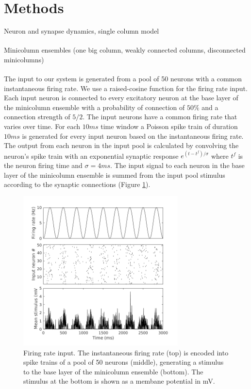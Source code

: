 \documentclass[a4paper,11pt]{article}
\begin{document}
\section{Methods}
Neuron and synapse dynamics, single column model
\\ \\
Minicolumn ensembles (one big column, weakly connected columns, disconnected minicolumns)
\\ \\
The input to our system is generated from a pool of 50 neurons with a common instantaneous firing rate.
We use a raised-cosine function for the firing rate input.
Each input neuron is connected to every excitatory neuron at the base layer of the minicolumn ensemble with a probability of connection of $50\%$ and a connection strength of $5/2$. 
The input neurons have a common firing rate that varies over time.
For each $10 ms$ time window a Poisson spike train of duration $10 ms$ is generated for every input neuron based on the instantaneous firing rate.
The output from each neuron in the input pool is calculated by convolving the neuron's spike train with an exponential synaptic response $e^{(t-t^f)/\sigma}$ where $t^f$ is the neuron firing time and $\sigma = 4ms$.
The input signal to each neuron in the base layer of the minicolumn ensemble is summed from the input pool stimulus according to the synaptic connections (Figure \ref{fig:firingrate_input}).

\begin{figure}[!ht]
 \caption{Firing rate input. The instantaneous firing rate (top) is encoded into spike trains of a pool of 50 neurons (middle), generating a stimulus to the base layer of the minicolumn ensemble (bottom). The stimulus at the bottom is shown as a membane potential in mV.}
 \label{fig:firingrate_input}
 \centering
   \includegraphics[width=0.75\textwidth]{fig/InputFiringRate}
\end{figure}
\end{document}

